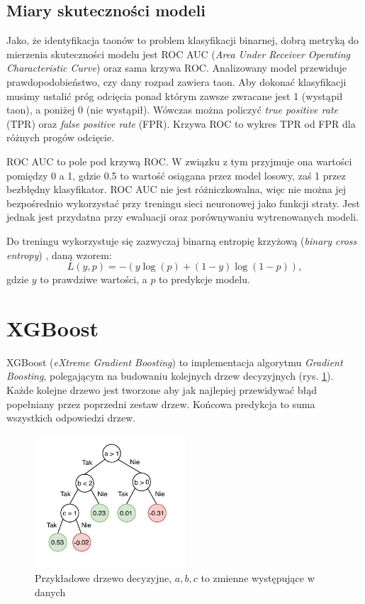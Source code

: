 \documentclass{pracalicmgr}
\begin{document}
	\subsection{Miary skuteczności modeli}
	Jako, że identyfikacja taonów to problem klasyfikacji binarnej, dobrą metryką do mierzenia skuteczności modelu jest ROC AUC (\textit{Area Under Receiver Operating Characteristic Curve}) oraz sama krzywa ROC. Analizowany model przewiduje prawdopodobieństwo, czy dany rozpad zawiera taon. Aby dokonać klasyfikacji musimy ustalić próg odcięcia ponad którym zawsze zwracane jest 1 (wystąpił taon), a poniżej 0 (nie wystąpił). Wówczas można policzyć \textit{true positive rate} (TPR) oraz \textit{false positive rate} (FPR). Krzywa ROC to wykres TPR od FPR dla różnych progów odcięcie.
	
	ROC AUC to pole pod krzywą ROC. W związku z tym przyjmuje ona wartości pomiędzy 0 a 1, gdzie 0.5 to wartość osiągana przez model losowy, zaś 1 przez bezbłędny klasyfikator. ROC AUC nie jest różniczkowalna, więc nie można jej bezpośrednio wykorzystać przy treningu sieci neuronowej jako funkcji straty. Jest jednak jest przydatna przy ewaluacji oraz porównywaniu wytrenowanych modeli.
	
	Do treningu wykorzystuje się zazwyczaj binarną entropię krzyżową (\textit{binary cross entropy}) \cite{dl}, daną wzorem: $$ L(y, p) = -(y\log(p)+(1-y)\log(1-p)),$$ gdzie $y$ to prawdziwe wartości, a $p$ to predykcje modelu.
	
	\section{XGBoost}
	XGBoost (\textit{eXtreme Gradient Boosting}) \cite{xgboost} to implementacja algorytmu \textit{Gradient Boosting}, polegającym na budowaniu kolejnych drzew decyzyjnych (rys. \ref{fig:tree}). Każde kolejne drzewo jest tworzone aby jak najlepiej przewidywać błąd popełniany przez poprzedni zestaw drzew. Końcowa predykcja to suma wszystkich odpowiedzi drzew.
	
	\begin{figure}[h]
	\centering
	\includegraphics[width=0.5\textwidth]{tree.pdf}
	\caption{Przykładowe drzewo decyzyjne, $a, b, c$ to zmienne występujące w danych}
	\label{fig:tree}
	\end{figure}
	
\end{document}
